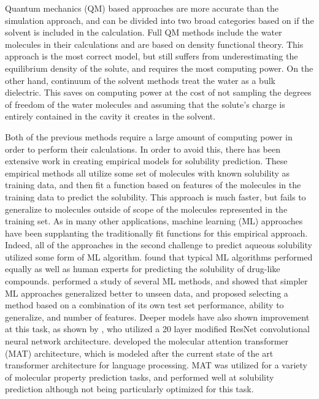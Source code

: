 \documentclass[journal=jmcmar,manuscript=article]{achemso}
\begin{document}
Quantum mechanics (QM) based approaches are more accurate than the simulation approach, and can be divided into two broad categories based on if the solvent is included in the calculation. 
Full QM methods include the water molecules in their calculations and are based on density functional theory\cite{solrev1}.
This approach is the most correct model, but still suffers from underestimating the equilibrium density of the solute, and requires the most computing power.
On the other hand, continuum of the solvent methods treat the water as a bulk dielectric.
This saves on computing power at the cost of not sampling the degrees of freedom of the water molecules and assuming that the solute's charge is entirely contained in the cavity it creates in the solvent.

Both of the previous methods require a large amount of computing power in order to perform their calculations.
In order to avoid this, there has been extensive work in creating empirical models for solubility prediction\cite{solrev1,solrev2}.
These empirical methods all utilize some set of molecules with known solubility as training data, and then fit a function based on features of the molecules in the training data to predict the solubility.
This approach is much faster, but fails to generalize to molecules outside of scope of the molecules represented in the training set.
As in many other applications, machine learning (ML) approaches have been supplanting the traditionally fit functions for this empirical approach.
Indeed, all of the approaches in the second challenge to predict aqueous solubility utilized some form of ML algorithm.\cite{llinas}
\citet{boobier} found that typical ML algorithms performed equally as well as human experts for predicting the solubility of drug-like compounds.
\citet{lovric} performed a study of several ML methods, and showed that simpler ML approaches generalized better to unseen data, and proposed selecting a method based on a combination of its own test set performance, ability to generalize, and number of features.
Deeper models have also shown improvement at this task, as shown by \citet{cui}, who utilized a 20 layer modified ResNet convolutional neural network architecture.
\citet{MAT} developed the molecular attention transformer (MAT) architecture, which is modeled after the current state of the art transformer architecture for language processing.
MAT was utilized for a variety of molecular property prediction tasks, and performed well at solubility prediction although not being particularly optimized for this task.
\end{document}
